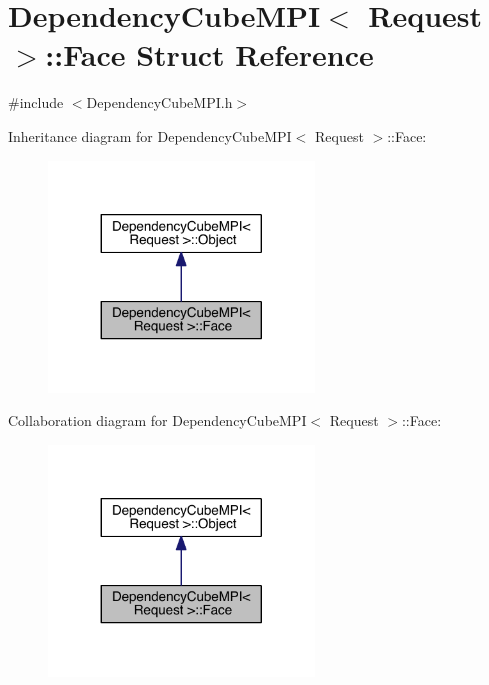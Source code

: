 \hypertarget{struct_dependency_cube_m_p_i_1_1_face}{}\section{Dependency\+Cube\+M\+P\+I$<$ Request $>$\+:\+:Face Struct Reference}
\label{struct_dependency_cube_m_p_i_1_1_face}


{\ttfamily \#include $<$Dependency\+Cube\+M\+P\+I.\+h$>$}



Inheritance diagram for Dependency\+Cube\+M\+P\+I$<$ Request $>$\+:\+:Face\+:\nopagebreak
\begin{figure}[H]
\begin{center}
\leavevmode
\includegraphics[width=200pt]{dd/dee/struct_dependency_cube_m_p_i_1_1_face__inherit__graph}
\end{center}
\end{figure}


Collaboration diagram for Dependency\+Cube\+M\+P\+I$<$ Request $>$\+:\+:Face\+:\nopagebreak
\begin{figure}[H]
\begin{center}
\leavevmode
\includegraphics[width=200pt]{d9/de6/struct_dependency_cube_m_p_i_1_1_face__coll__graph}
\end{center}
\end{figure}
